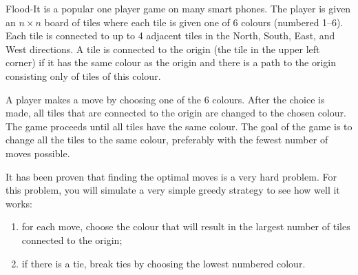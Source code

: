 
Flood-It is a popular one player game on many smart phones.  The
player is given an $n \times n$ board of tiles where each tile is
given one of 6 colours (numbered 1--6).  Each tile is connected to up
to 4 adjacent tiles in the North, South, East, and West directions.  A
tile is connected to the origin (the tile in the upper left corner) if
it has the same colour as the origin and there is a path to the origin
consisting only of tiles of this colour.

A player makes a move by choosing one of the 6 colours.  After the
choice is made, all tiles that are connected to the origin are changed
to the chosen colour.  The game proceeds until all tiles have the same
colour.  The goal of the game is to change all the tiles to the same
colour, preferably with the fewest number of moves possible.

It has been proven that finding the optimal moves is a very hard
problem.  For this problem, you will simulate a very simple greedy
strategy to see how well it works:
\begin{enumerate}
\item for each move, choose the colour that will result in the largest
  number of tiles connected to the origin;
\item if there is a tie, break ties by choosing the lowest numbered colour.
\end{enumerate}

